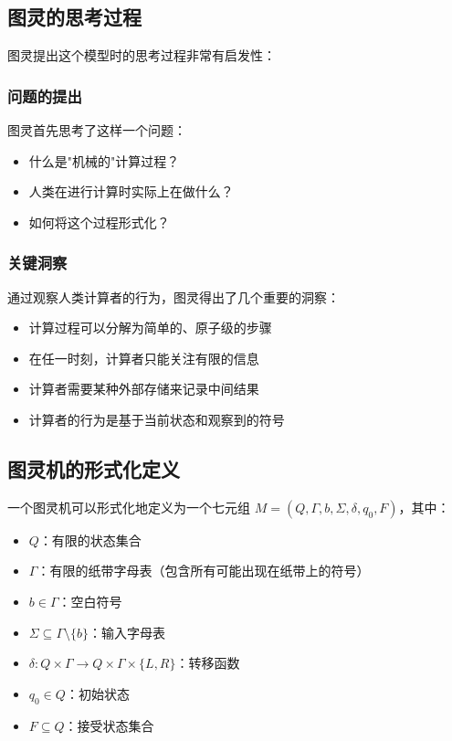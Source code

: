 \documentclass[a4paper,12pt]{ctexart}
\begin{document}
\subsection{图灵的思考过程}
图灵提出这个模型时的思考过程非常有启发性：

\subsubsection{问题的提出}
图灵首先思考了这样一个问题：
\begin{itemize}
    \item 什么是"机械的"计算过程？
    \item 人类在进行计算时实际上在做什么？
    \item 如何将这个过程形式化？
\end{itemize}

\subsubsection{关键洞察}
通过观察人类计算者的行为，图灵得出了几个重要的洞察：
\begin{itemize}
    \item 计算过程可以分解为简单的、原子级的步骤
    \item 在任一时刻，计算者只能关注有限的信息
    \item 计算者需要某种外部存储来记录中间结果
    \item 计算者的行为是基于当前状态和观察到的符号
\end{itemize}

\subsection{图灵机的形式化定义}
一个图灵机可以形式化地定义为一个七元组 $M = (Q, \Gamma, b, \Sigma, \delta, q_0, F)$，其中：

\begin{itemize}
    \item $Q$：有限的状态集合
    \item $\Gamma$：有限的纸带字母表（包含所有可能出现在纸带上的符号）
    \item $b \in \Gamma$：空白符号
    \item $\Sigma \subseteq \Gamma \setminus \{b\}$：输入字母表
    \item $\delta: Q \times \Gamma \rightarrow Q \times \Gamma \times \{L,R\}$：转移函数
    \item $q_0 \in Q$：初始状态
    \item $F \subseteq Q$：接受状态集合
\end{itemize}
\end{document}
